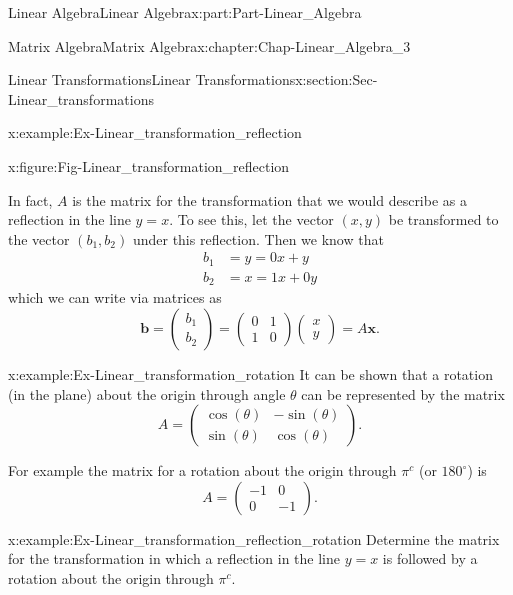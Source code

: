 \documentclass[oneside,10pt,]{book}
\numberwithin{equation}{section}
\newcommand{\amp}{&}
\begin{document}
\begin{partptx}{Linear Algebra}{}{Linear Algebra}{}{}{x:part:Part-Linear_Algebra}
\begin{chapterptx}{Matrix Algebra}{}{Matrix Algebra}{}{}{x:chapter:Chap-Linear_Algebra_3}
\begin{sectionptx}{Linear Transformations}{}{Linear Transformations}{}{}{x:section:Sec-Linear_transformations}
\begin{example}{}{x:example:Ex-Linear_transformation_reflection}
\begin{figureptx}{}{x:figure:Fig-Linear_transformation_reflection}{}
\begin{image}{0.15}{0.7}{0.15}
\end{image}%
\tcblower
\end{figureptx}%
%
\par
In fact, \(A\) is the matrix for the transformation that we would describe as a reflection in the line \(y = x\). To see this, let the vector \((x,y)\) be transformed to the vector \((b_1,b_2)\) under this reflection. Then we know that%
\begin{align*}
b_1 \amp = y = 0x +y \\
b_2 \amp = x = 1x + 0y 
\end{align*}
which we can write via matrices as%
\begin{equation*}
\mathbf{b} = \begin{pmatrix}b_1 \\ b_2 \end{pmatrix} = \begin{pmatrix} 0 \amp 1 \\ 1 \amp 0\end{pmatrix}\begin{pmatrix} x \\ y \end{pmatrix} = A\mathbf{x}.
\end{equation*}
%
\end{example}
\begin{example}{}{x:example:Ex-Linear_transformation_rotation}%
It can be shown that a rotation (in the plane) about the origin through angle \(\theta\) can be represented by the matrix%
\begin{equation*}
A = \begin{pmatrix} \cos(\theta) \amp -\sin(\theta) \\ \sin(\theta) \amp \cos(\theta)\end{pmatrix}.
\end{equation*}
%
\par
For example the matrix for a rotation about the origin through \(\pi^{c}\) (or \(180^{\circ}\)) is%
\begin{equation*}
A = \begin{pmatrix} -1 \amp 0 \\ 0 \amp -1 \end{pmatrix}.
\end{equation*}
%
\end{example}
\begin{example}{}{x:example:Ex-Linear_transformation_reflection_rotation}%
Determine the matrix for the transformation in which a reflection in the line \(y = x\) is followed by a rotation about the origin through \(\pi^c\).%

\end{example}
\end{sectionptx}
\end{chapterptx}
\end{partptx}
\end{document}

